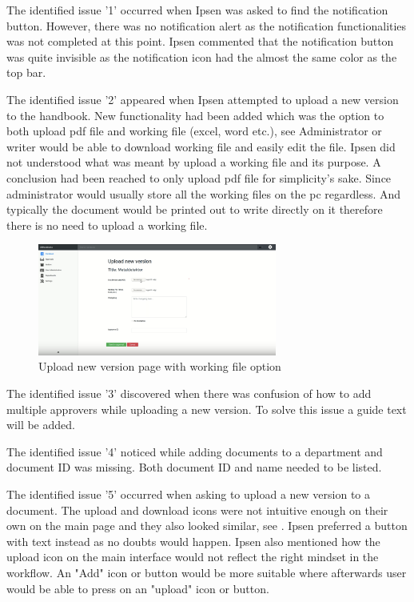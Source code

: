 The identified issue '1' occurred when Ipsen was asked to find the notification button. However, there was no notification alert as the notification functionalities was not completed at this point. 
Ipsen commented that the notification button was quite invisible as the notification icon had the almost the same color as the top bar.

The identified issue '2' appeared when Ipsen attempted to upload a new version to the handbook. 
New functionality had been added which was the option to both upload pdf file and working file (excel, word etc.), see 
Administrator or writer would be able to download working file and easily edit the file. 
Ipsen did not understood what was meant by upload a working file and its purpose.
A conclusion had been reached to only upload pdf file for simplicity's sake. 
Since administrator would usually store all the working files on the pc regardless. 
And typically the document would be printed out to write directly on it therefore there is no need to upload a working file. 

\begin{figure}[H]
	\centering
		\includegraphics[width=0.7\textwidth]{billeder/WorkingFile.png}
	\caption{Upload new version page with working file option}\label{fig:WorkingFile}
\end{figure}

The identified issue '3' discovered when there was confusion of how to add multiple approvers while uploading a new version.
To solve this issue a guide text will be added. 

The identified issue '4' noticed while adding documents to a department and document ID was missing. 
Both document ID and name needed to be listed.

The identified issue '5' occurred when asking to upload a new version to a document. 
The upload and download icons were not intuitive enough on their own on the main page and they also looked similar, see . 
Ipsen preferred a button with text instead as no doubts would happen. 
Ipsen also mentioned how the upload icon on the main interface would not reflect the right mindset in the workflow. 
An "Add" icon or button would be more suitable where afterwards user would be able to press on an "upload" icon or button. 

